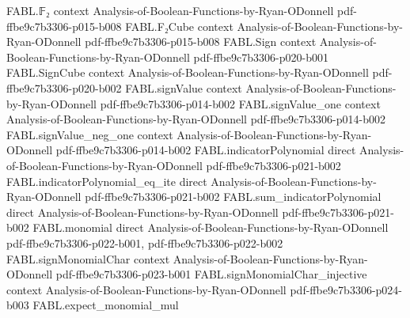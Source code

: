 \begin{theorem}
\label{FABL.hastad_dictatorVsNoNotables}
\leanok
{}
\proofstep
  {FABL.𝔽₂}
  {context}
  {Analysis-of-Boolean-Functions-by-Ryan-ODonnell}
  {pdf-ffbe9c7b3306-p015-b008}
\proofstep
  {FABL.F₂Cube}
  {context}
  {Analysis-of-Boolean-Functions-by-Ryan-ODonnell}
  {pdf-ffbe9c7b3306-p015-b008}
\proofstep
  {FABL.Sign}
  {context}
  {Analysis-of-Boolean-Functions-by-Ryan-ODonnell}
  {pdf-ffbe9c7b3306-p020-b001}
\proofstep
  {FABL.SignCube}
  {context}
  {Analysis-of-Boolean-Functions-by-Ryan-ODonnell}
  {pdf-ffbe9c7b3306-p020-b002}
\proofstep
  {FABL.signValue}
  {context}
  {Analysis-of-Boolean-Functions-by-Ryan-ODonnell}
  {pdf-ffbe9c7b3306-p014-b002}
\proofstep
  {FABL.signValue_one}
  {context}
  {Analysis-of-Boolean-Functions-by-Ryan-ODonnell}
  {pdf-ffbe9c7b3306-p014-b002}
\proofstep
  {FABL.signValue_neg_one}
  {context}
  {Analysis-of-Boolean-Functions-by-Ryan-ODonnell}
  {pdf-ffbe9c7b3306-p014-b002}
\proofstep
  {FABL.indicatorPolynomial}
  {direct}
  {Analysis-of-Boolean-Functions-by-Ryan-ODonnell}
  {pdf-ffbe9c7b3306-p021-b002}
\proofstep
  {FABL.indicatorPolynomial_eq_ite}
  {direct}
  {Analysis-of-Boolean-Functions-by-Ryan-ODonnell}
  {pdf-ffbe9c7b3306-p021-b002}
\proofstep
  {FABL.sum_indicatorPolynomial}
  {direct}
  {Analysis-of-Boolean-Functions-by-Ryan-ODonnell}
  {pdf-ffbe9c7b3306-p021-b002}
\proofstep
  {FABL.monomial}
  {direct}
  {Analysis-of-Boolean-Functions-by-Ryan-ODonnell}
  {pdf-ffbe9c7b3306-p022-b001,
    pdf-ffbe9c7b3306-p022-b002}
\proofstep
  {FABL.signMonomialChar}
  {context}
  {Analysis-of-Boolean-Functions-by-Ryan-ODonnell}
  {pdf-ffbe9c7b3306-p023-b001}
\proofstep
  {FABL.signMonomialChar_injective}
  {context}
  {Analysis-of-Boolean-Functions-by-Ryan-ODonnell}
  {pdf-ffbe9c7b3306-p024-b003}
\proofstep
  {FABL.expect_monomial_mul}

\end{theorem}
